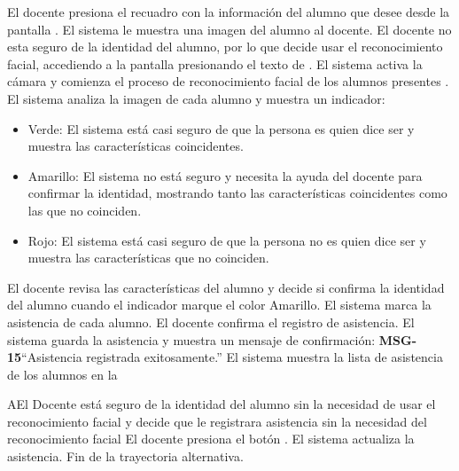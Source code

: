 \begin{UCtrayectoria}
	\UCpaso[\UCactor] El docente presiona el recuadro con la información del alumno que desee desde la pantalla .
	\UCpaso El sistema le muestra una imagen del alumno al docente.
	\UCpaso[\UCactor] El docente no esta seguro de la identidad del alumno, por lo que decide usar el reconocimiento facial, accediendo a la pantalla  presionando el texto de .  
	\UCpaso El sistema activa la cámara y comienza el proceso de reconocimiento facial de los alumnos presentes .  
	\UCpaso El sistema analiza la imagen de cada alumno y muestra un indicador:
	\begin{itemize}
		\item Verde: El sistema está casi seguro de que la persona es quien dice ser y muestra las características coincidentes.
		\item Amarillo: El sistema no está seguro y necesita la ayuda del docente para confirmar la identidad, mostrando tanto las características coincidentes como las que no coinciden. 
		\item Rojo: El sistema está casi seguro de que la persona no es quien dice ser y muestra las características que no coinciden. 
	\end{itemize}
	\UCpaso[\UCactor] El docente revisa las características del alumno y decide si confirma la identidad del alumno cuando el indicador marque el color Amarillo. 
	\UCpaso El sistema marca la asistencia de cada alumno.
	\UCpaso[\UCactor] El docente confirma el registro de asistencia.
	\UCpaso El sistema guarda la asistencia y muestra un mensaje de confirmación: {\bf MSG-15}{``Asistencia registrada exitosamente.''}
	\UCpaso El sistema muestra la lista de asistencia de los alumnos en la 
\end{UCtrayectoria}
\begin{UCtrayectoriaA}{A}{El Docente está seguro de la identidad del alumno sin la necesidad de usar el reconocimiento facial y decide que le registrara asistencia sin la necesidad del reconocimiento facial}
	\UCpaso[\UCactor] El docente presiona el botón .
	\UCpaso El sistema actualiza la asistencia.
	\UCpaso Fin de la trayectoria alternativa.
\end{UCtrayectoriaA}
